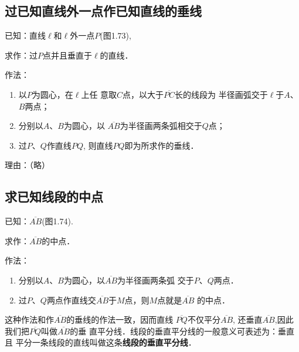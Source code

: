 \subsection{过已知直线外一点作已知直线的垂线}
已知：直线$\ell$和$\ell$外一点$P$(图1.73),

求作：过$P$点并且垂直于$\ell$的直线．

作法：
\begin{enumerate}
\item 以$P$为圆心，在$\ell$上任
意取$C$点，以大于$\overline{PC}$长的线段为
半径画弧交于$\ell$于$A$、$B$两点；
\item 分别以$A$、$B$为圆心，以
$\overline{AB}$为半径画两条弧相交于$Q$点；
\item 过$P$、$Q$作直线$PQ$, 则直线$PQ$即为所求作的垂线．
\end{enumerate}

理由：（略）

\subsection{求已知线段的中点}

已知：$\overline{AB}$(图1.74).

求作：$\overline{AB}$的中点．

作法：
\begin{enumerate}
\item 分别以$A$、$B$为圆心，以$\overline{AB}$为半径画两条弧
交于$P$、$Q$两点．
\item 过$P$、$Q$两点作直线交$\overline{AB}$于$M$点，则$M$点就是$\overline{AB}$
的中点．
\end{enumerate}

\begin{rmk}
	这种作法和作$\overline{AB}$的垂线的作法一致，因而直线
	$\overline{PQ}$不仅平分$\overline{AB}$, 还垂直$\overline{AB}$,因此我们把$\overline{PQ}$叫做$\overline{AB}$的垂
直平分线．线段的垂直平分线的一般意义可表述为：垂直且
平分一条线段的直线叫做这条\textbf{线段的垂直平分线}．
\end{rmk}

